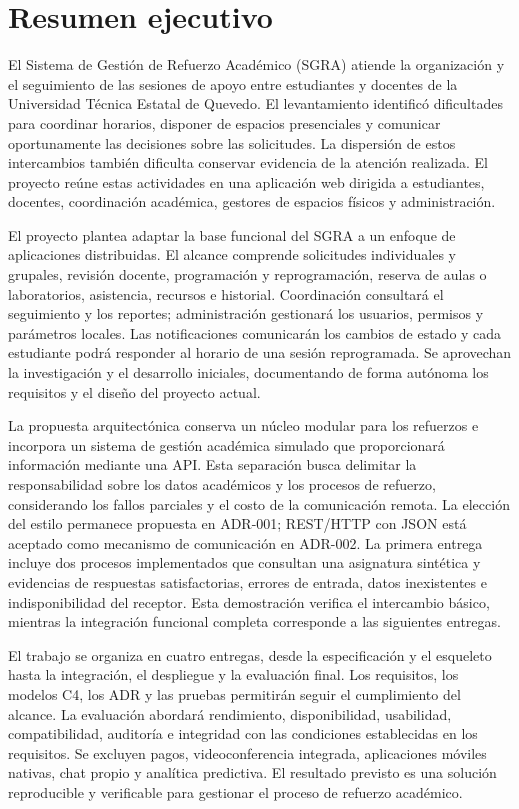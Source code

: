 \section{Resumen ejecutivo}

El Sistema de Gestión de Refuerzo Académico (SGRA) atiende la organización y el seguimiento de las sesiones de apoyo entre estudiantes y docentes de la Universidad Técnica Estatal de Quevedo. El levantamiento identificó dificultades para coordinar horarios, disponer de espacios presenciales y comunicar oportunamente las decisiones sobre las solicitudes. La dispersión de estos intercambios también dificulta conservar evidencia de la atención realizada. El proyecto reúne estas actividades en una aplicación web dirigida a estudiantes, docentes, coordinación académica, gestores de espacios físicos y administración.

El proyecto plantea adaptar la base funcional del SGRA a un enfoque de aplicaciones distribuidas. El alcance comprende solicitudes individuales y grupales, revisión docente, programación y reprogramación, reserva de aulas o laboratorios, asistencia, recursos e historial. Coordinación consultará el seguimiento y los reportes; administración gestionará los usuarios, permisos y parámetros locales. Las notificaciones comunicarán los cambios de estado y cada estudiante podrá responder al horario de una sesión reprogramada. Se aprovechan la investigación y el desarrollo iniciales, documentando de forma autónoma los requisitos y el diseño del proyecto actual.

La propuesta arquitectónica conserva un núcleo modular para los refuerzos e incorpora un sistema de gestión académica simulado que proporcionará información mediante una API. Esta separación busca delimitar la responsabilidad sobre los datos académicos y los procesos de refuerzo, considerando los fallos parciales y el costo de la comunicación remota. La elección del estilo permanece propuesta en ADR-001; REST/HTTP con JSON está aceptado como mecanismo de comunicación en ADR-002. La primera entrega incluye dos procesos implementados que consultan una asignatura sintética y evidencias de respuestas satisfactorias, errores de entrada, datos inexistentes e indisponibilidad del receptor. Esta demostración verifica el intercambio básico, mientras la integración funcional completa corresponde a las siguientes entregas.

El trabajo se organiza en cuatro entregas, desde la especificación y el esqueleto hasta la integración, el despliegue y la evaluación final. Los requisitos, los modelos C4, los ADR y las pruebas permitirán seguir el cumplimiento del alcance. La evaluación abordará rendimiento, disponibilidad, usabilidad, compatibilidad, auditoría e integridad con las condiciones establecidas en los requisitos. Se excluyen pagos, videoconferencia integrada, aplicaciones móviles nativas, chat propio y analítica predictiva. El resultado previsto es una solución reproducible y verificable para gestionar el proceso de refuerzo académico.
